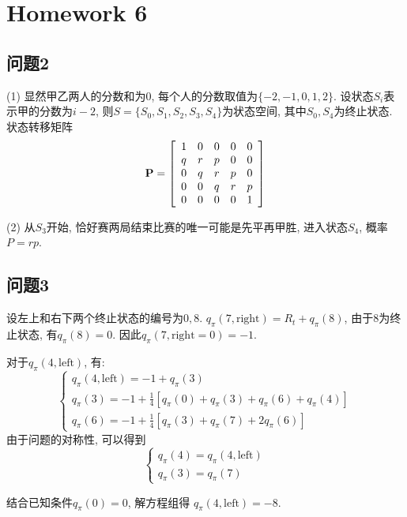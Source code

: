 \section{Homework 6}

\subsection{问题2}

(1) 显然甲乙两人的分数和为$0$, 每个人的分数取值为$\{-2,-1,0,1,2\}$. 设状态$S_i$表示甲的分数为$i-2$, 则$S=\{S_0,S_1,S_2,S_3,S_4\}$为状态空间, 其中$S_0,S_4$为终止状态. 状态转移矩阵\begin{equation*}
    \bf P = \left[\begin{array}{ccccc}
        1 & 0 & 0 & 0 & 0 \\
        q & r & p & 0 & 0 \\
        0 & q & r & p & 0 \\
        0 & 0 & q & r & p \\
        0 & 0 & 0 & 0 & 1
    \end{array}\right]
\end{equation*}

(2) 从$S_3$开始, 恰好赛两局结束比赛的唯一可能是先平再甲胜, 进入状态$S_4$, 概率$P=rp$.

\subsection{问题3}

设左上和右下两个终止状态的编号为$0,8$. $q_\pi(7,\text{right})=R_t+q_\pi(8)$, 由于$8$为终止状态, 有$q_\pi(8)=0$. 因此$q_\pi(7,\text{right}=0)=-1$.

对于$q_\pi(4,\text{left})$, 有: \begin{equation*}
    \left\{\begin{array}{ll}
        q_\pi(4,\text{left}) = -1 + q_\pi(3) \\
        q_\pi(3) = -1 + \frac{1}{4}[q_\pi(0)+q_\pi(3)+q_\pi(6)+q_\pi(4)] \\
        q_\pi(6) = -1 + \frac{1}{4}[q_\pi(3)+q_\pi(7)+2q_\pi(6)]
    \end{array}\right.
\end{equation*}
由于问题的对称性, 可以得到\begin{equation*}
    \left\{
        \begin{array}{ll}
            q_\pi(4)=q_\pi(4,\text{left}) \\
            q_\pi(3)=q_\pi(7)
        \end{array}
    \right.
\end{equation*}

结合已知条件$q_\pi(0)=0$, 解方程组得 $q_\pi(4,\text{left})=-8$.